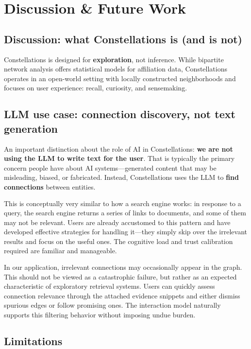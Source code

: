\section{Discussion \& Future Work}

\subsection{Discussion: what Constellations is (and is not)}

Constellations is designed for \textbf{exploration}, not inference. While bipartite network analysis offers statistical models for affiliation data, Constellations operates in an open-world setting with locally constructed neighborhoods and focuses on user experience: recall, curiosity, and sensemaking.

\subsection{LLM use case: connection discovery, not text generation}

An important distinction about the role of AI in Constellations: \textbf{we are not using the LLM to write text for the user}. That is typically the primary concern people have about AI systems---generated content that may be misleading, biased, or fabricated. Instead, Constellations uses the LLM to \textbf{find connections} between entities.

This is conceptually very similar to how a search engine works: in response to a query, the search engine returns a series of links to documents, and some of them may not be relevant. Users are already accustomed to this pattern and have developed effective strategies for handling it---they simply skip over the irrelevant results and focus on the useful ones. The cognitive load and trust calibration required are familiar and manageable.

In our application, irrelevant connections may occasionally appear in the graph. This should not be viewed as a catastrophic failure, but rather as an expected characteristic of exploratory retrieval systems. Users can quickly assess connection relevance through the attached evidence snippets and either dismiss spurious edges or follow promising ones. The interaction model naturally supports this filtering behavior without imposing undue burden.

\subsection{Limitations}

